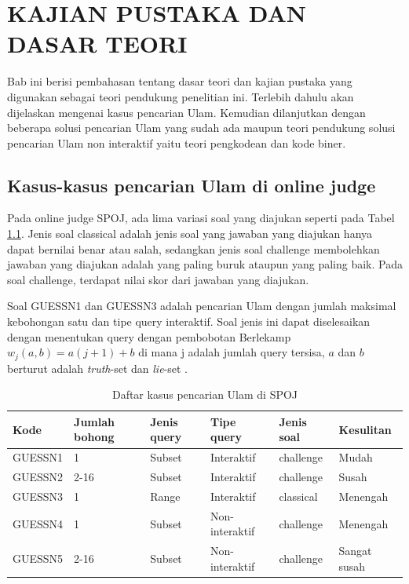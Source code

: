 \chapter {KAJIAN PUSTAKA DAN DASAR TEORI}

Bab ini berisi pembahasan tentang dasar teori dan kajian pustaka yang digunakan sebagai teori pendukung penelitian ini. Terlebih dahulu akan dijelaskan mengenai kasus pencarian Ulam. Kemudian dilanjutkan dengan beberapa solusi pencarian Ulam yang sudah ada maupun teori pendukung solusi pencarian Ulam non interaktif yaitu teori pengkodean dan kode biner.

\section{Kasus-kasus pencarian Ulam di online judge}

Pada online judge SPOJ, ada lima variasi soal yang diajukan seperti pada Tabel \ref{tab:kasus_spoj}. Jenis soal classical adalah jenis soal yang jawaban yang diajukan hanya dapat bernilai benar atau salah, sedangkan jenis soal challenge membolehkan jawaban yang diajukan adalah yang paling buruk ataupun yang paling baik. Pada soal challenge, terdapat nilai skor dari jawaban yang diajukan.

Soal GUESSN1 dan GUESSN3 adalah pencarian Ulam dengan jumlah maksimal kebohongan satu dan tipe query interaktif. Soal jenis ini dapat diselesaikan dengan menentukan query dengan pembobotan Berlekamp $w_j (a,b)=a(j+1)+b$ di mana j adalah jumlah query tersisa, $a$ dan $b$ berturut adalah \textit{truth}-set dan \textit{lie}-set \cite{Pelc1987}.

\begin{table}[h!]
\caption{Daftar kasus pencarian Ulam di SPOJ}
\label{tab:kasus_spoj}
\begin{center}
\begin{tabular} {|l|l|l|l|l|l|}
\hline
Kode & Jumlah bohong & Jenis query & Tipe query & Jenis soal & Kesulitan \\
\hline
GUESSN1 & 1 & Subset & Interaktif & challenge & Mudah \\
\hline
GUESSN2 & 2-16 & Subset & Interaktif & challenge & Susah  \\
\hline
GUESSN3 & 1 & Range & Interaktif & classical & Menengah \\
\hline
GUESSN4 & 1 & Subset & Non-interaktif & challenge & Menengah \\
\hline
GUESSN5 & 2-16 & Subset & Non-interaktif & challenge & Sangat susah \\
\hline
\end{tabular}
\end{center}
\end{table}



